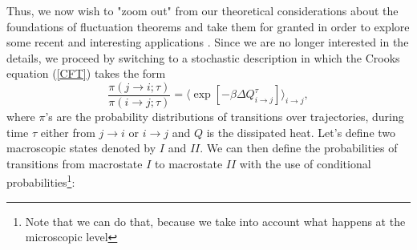 \documentclass[a4paper,12pt]{article}
\begin{document}
Thus, we now wish to "zoom out" from our theoretical considerations about the foundations of fluctuation theorems and take them for granted in order to explore some recent and interesting applications \cite{Perunov:2016hl, England:2013ed}. 
Since we are no longer interested in the details, we proceed by switching to a stochastic description in which the Crooks equation (\ref{CFT}) takes the form
\begin{equation}
\label{MicroscopicIrreversibility}
\frac{\pi (j\to i;\tau )}{\pi (i\to j;\tau )}= \langle \exp[-\beta  \Delta Q_{i\to j}^{\tau}] \rangle_{i \to j},
\end{equation}
where $\pi$'s are the probability distributions of transitions over trajectories, during time $\tau$ either from $ j\to i$ or $ i \to j $ and $Q$ is the dissipated heat.
Let's define two macroscopic states denoted by $I$ and $II$.
We can then define the probabilities of transitions from macrostate $I$ to macrostate $II$ with the use of conditional probabilities\footnote{Note that we can do that, because we take into account what happens at the microscopic level}:
\end{document}

